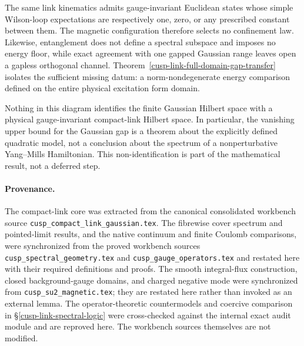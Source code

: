 \documentclass[11pt]{article}
\theoremstyle{definition}
\numberwithin{equation}{section}
\begin{document}
The same link kinematics admits gauge-invariant Euclidean states whose simple
Wilson-loop expectations are respectively one, zero, or any prescribed
constant between them.  The magnetic configuration therefore selects no
confinement law.  Likewise, entanglement does not define a spectral subspace
and imposes no energy floor, while exact agreement with one gapped Gaussian
range leaves open a gapless orthogonal channel.  Theorem~\ref{cusp-link-full-domain-gap-transfer}
isolates the sufficient missing datum: a norm-nondegenerate energy comparison
defined on the entire physical excitation form domain.

Nothing in this diagram identifies the finite Gaussian Hilbert space with a
physical gauge-invariant compact-link Hilbert space.  In particular, the
vanishing upper bound for the Gaussian gap is a theorem about the explicitly
defined quadratic model, not a conclusion about the spectrum of a
nonperturbative Yang--Mills Hamiltonian.  This non-identification is part of
the mathematical result, not a deferred step.

\paragraph{Provenance.}
The compact-link core was extracted from the canonical consolidated
workbench source \texttt{cusp\_compact\_link\_gaussian.tex}.  The fibrewise
cover spectrum and pointed-limit results, and the native continuum and finite
Coulomb comparisons, were synchronized from the proved workbench sources
 \texttt{cusp\_spectral\_geometry.tex} and
 \texttt{cusp\_gauge\_operators.tex} and restated here with their required
 definitions and proofs.  The smooth integral-flux construction, closed
 background-gauge domains, and charged negative mode were synchronized from
 \texttt{cusp\_su2\_magnetic.tex}; they are restated here rather than invoked
 as an external lemma.  The operator-theoretic countermodels and coercive
comparison in \S\ref{cusp-link-spectral-logic} were cross-checked against the
internal exact audit module
 and are
reproved here.  The workbench sources themselves are not modified.

\begingroup
\small


\endgroup
\end{document}
